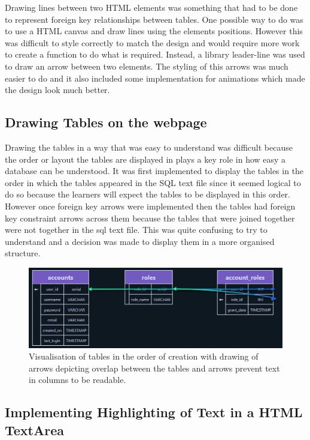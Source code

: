 Drawing lines between two HTML elements was something that had to be done to represent foreign key relationships between tables. One possible way to do was to use a HTML canvas and draw lines using the elements positions. However this was difficult to style correctly to match the design and would require more work to create a function to do what is required. Instead, a library leader-line \cite{leader-line} was used to draw an arrow between two elements. The styling of this arrows was much easier to do and it also included some implementation for animations which made the design look much better.

\subsection{Drawing Tables on the webpage}

Drawing the tables in a way that was easy to understand was difficult because the order or layout the tables are displayed in plays a key role in how easy a database can be understood. It was first implemented to display the tables in the order in which the tables appeared in the SQL text file since it seemed logical to do so because the learners will expect the tables to be displayed in this order. However once foreign key arrows were implemented then the tables had foreign key constraint arrows across them because the tables that were joined together were not together in the sql text file. This was quite confusing to try to understand and a decision was made to display them in a more organised structure. 

\begin{figure}[h!]
	\centering
	\includegraphics[width=\textwidth]{overlap}
	\caption{Visualisation of tables in the order of creation with drawing of arrows depicting overlap between the tables and arrows prevent text in columns to be readable.}
	\label{fig:overlap}
\end{figure}

\subsection{Implementing Highlighting of Text in a HTML TextArea}

